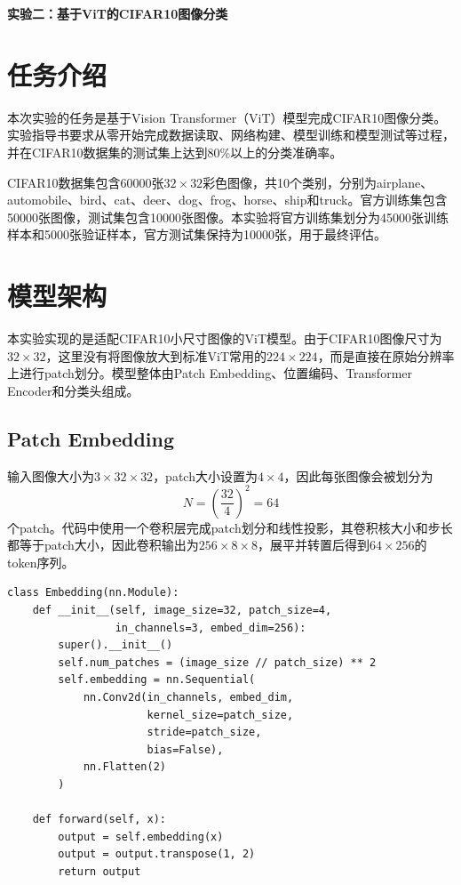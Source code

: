 \documentclass[11pt]{article}
\begin{document}
	\pagestyle{fancy}
	\chead{}
	
	\begin{center}
		{\LARGE \bf 实验二：基于ViT的CIFAR10图像分类}
	\end{center}
	\begin{center}
		\large{}
	\end{center}

	\section{任务介绍}
	本次实验的任务是基于Vision Transformer（ViT）模型完成CIFAR10图像分类。实验指导书要求从零开始完成数据读取、网络构建、模型训练和模型测试等过程，并在CIFAR10数据集的测试集上达到80\%以上的分类准确率。

	CIFAR10数据集包含60000张$32\times 32$彩色图像，共10个类别，分别为airplane、automobile、bird、cat、deer、dog、frog、horse、ship和truck。官方训练集包含50000张图像，测试集包含10000张图像。本实验将官方训练集划分为45000张训练样本和5000张验证样本，官方测试集保持为10000张，用于最终评估。

	\section{模型架构}
	本实验实现的是适配CIFAR10小尺寸图像的ViT模型。由于CIFAR10图像尺寸为$32\times 32$，这里没有将图像放大到标准ViT常用的$224\times 224$，而是直接在原始分辨率上进行patch划分。模型整体由Patch Embedding、位置编码、Transformer Encoder和分类头组成。

	\subsection{Patch Embedding}
	输入图像大小为$3\times 32\times 32$，patch大小设置为$4\times 4$，因此每张图像会被划分为
	\[
		N=\left(\frac{32}{4}\right)^2=64
	\]
	个patch。代码中使用一个卷积层完成patch划分和线性投影，其卷积核大小和步长都等于patch大小，因此卷积输出为$256\times 8\times 8$，展平并转置后得到$64\times 256$的token序列。

	\begin{lstlisting}
class Embedding(nn.Module):
    def __init__(self, image_size=32, patch_size=4,
                 in_channels=3, embed_dim=256):
        super().__init__()
        self.num_patches = (image_size // patch_size) ** 2
        self.embedding = nn.Sequential(
            nn.Conv2d(in_channels, embed_dim,
                      kernel_size=patch_size,
                      stride=patch_size,
                      bias=False),
            nn.Flatten(2)
        )

    def forward(self, x):
        output = self.embedding(x)
        output = output.transpose(1, 2)
        return output
	\end{lstlisting}
\end{document}
